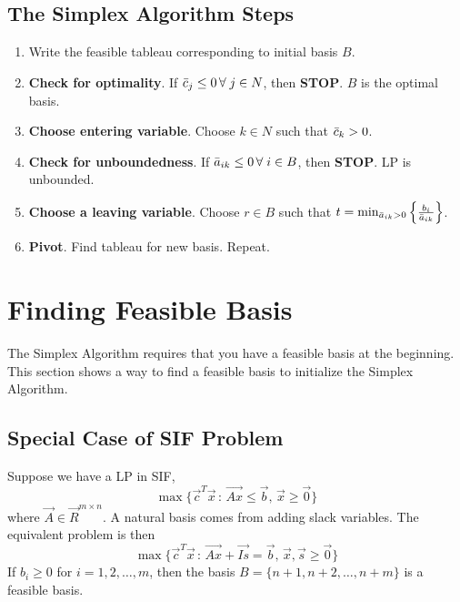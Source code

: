 \subsection{The Simplex Algorithm Steps}

\begin{enumerate}
    \item Write the feasible tableau corresponding to initial basis $B$.
    \item \textbf{Check for optimality}. If $\Bar{c}_j\leq 0 \,\forall\; j\in N$, then \textbf{STOP}. $B$ is the optimal basis.
    \item \textbf{Choose entering variable}. Choose $k\in N$ such that $\Bar{c}_k>0$.
    \item \textbf{Check for unboundedness}. If $\Bar{a}_{ik}\leq 0 \,\forall\; i\in B$, then \textbf{STOP}. LP is unbounded.
    \item \textbf{Choose a leaving variable}. Choose $r\in B$ such that $t = \min_{\Bar{a}_{ik}>0}
    \Big\{\frac{b_i}{\Bar{a}_{ik}}\Big\}$.
    \item \textbf{Pivot}. Find tableau for new basis. Repeat.
\end{enumerate}



\section{Finding Feasible Basis}
The Simplex Algorithm requires that you have a feasible basis at the beginning. This section shows a way to find a feasible basis to initialize the Simplex Algorithm.


\subsection{Special Case of SIF Problem}
Suppose we have a LP in SIF,
\begin{equation}
    \max\{\Vec{c}^T\Vec{x}\,:\, \Vec{Ax}\leq \Vec{b},\, \Vec{x}\geq\Vec{0}\}
\end{equation}
where $\Vec{A}\in\Vec{R}^{m\times n}$. A natural basis comes from adding slack variables. The equivalent problem is then
\begin{equation}
    \max\{\Vec{c}^T\Vec{x}\,:\, \Vec{Ax}+\Vec{Is} =\Vec{b},\, \Vec{x},\Vec{s}\geq\Vec{0}\}
\end{equation}
If $b_i\geq 0$ for $i=1,2,\dots,m$, then the basis $B=\{n+1,n+2,\dots,n+m\}$ is a feasible basis.


